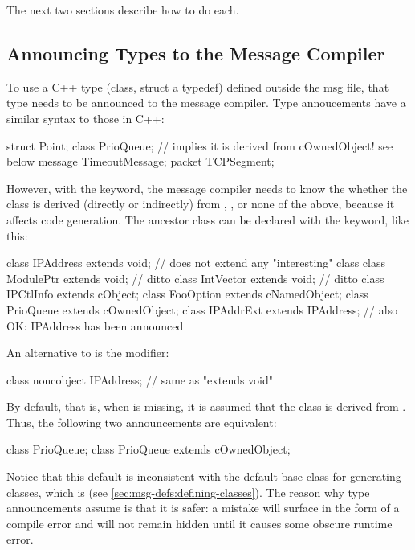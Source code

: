 The next two sections describe how to do each.


\subsection{Announcing Types to the Message Compiler}
\label{sec:msg-defs:announcing-types}

To use a C++ type (class, struct a typedef) defined outside the msg file,
that type needs to be announced to the message compiler. Type annoucements
have a similar syntax to those in C++:

\begin{msg}
struct Point;
class PrioQueue;  // implies it is derived from cOwnedObject! see below
message TimeoutMessage;
packet TCPSegment;
\end{msg}

However, with the  keyword, the message compiler needs to
know the whether the class is derived (directly or indirectly) from
, ,  or none of
the above, because it affects code generation. The ancestor class can be
declared with the  keyword, like this:

\begin{msg}
class IPAddress extends void;  // does not extend any "interesting" class
class ModulePtr extends void;  // ditto
class IntVector extends void;  // ditto
class IPCtlInfo extends cObject;
class FooOption extends cNamedObject;
class PrioQueue extends cOwnedObject;
class IPAddrExt extends IPAddress;  // also OK: IPAddress has been announced
\end{msg}

An alternative to  is the  modifier:

\begin{msg}
class noncobject IPAddress; // same as "extends void"
\end{msg}

By default, that is, when  is missing, it is assumed
that the class is derived from . Thus, the following
two announcements are equivalent:

\begin{msg}
class PrioQueue;
class PrioQueue extends cOwnedObject;
\end{msg}

\begin{note}
Notice that this default is inconsistent with the default base class for
generating classes, which is  (see
\ref{sec:msg-defs:defining-classes}). The reason why type announcements
assume  is that it is safer: a mistake will surface in
the form of a compile error and will not remain hidden until it causes some
obscure runtime error.
\end{note}


